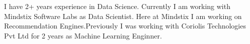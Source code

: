 
\begin{cvparagraph}
I have 2+ years experience in Data Science. Currently I am working with Mindstix Software Labs as Data Scientist. Here at Mindstix I am working on Recommendation Engines.\newline Previously I was working with Coriolis Technologies Pvt Ltd for 2 years as Machine Learning Enginner.
\end{cvparagraph}

